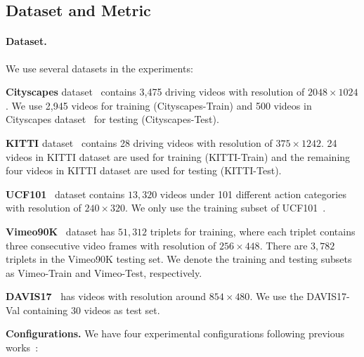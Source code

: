 \documentclass[10pt,twocolumn,letterpaper]{article}
\begin{document}
\subsection{Dataset and Metric}
\label{sec:dataset}
\paragraph{Dataset.} We use several datasets in the experiments:

\vspace{0.4em}
\noindent \textbf{Cityscapes} dataset~\cite{cityscapes} contains 3,475 driving videos with resolution of $2048 \times 1024$. We use 2,945 videos for training (Cityscapes-Train) and 500 videos in Cityscapes dataset~\cite{cityscapes} for testing (Cityscapes-Test).

\vspace{0.4em}
\noindent \textbf{KITTI} dataset~\cite{kitti} contains 28 driving videos with resolution of $375\times 1242$. 24 videos in KITTI dataset are used for training (KITTI-Train) and the remaining four videos in KITTI dataset are used for testing (KITTI-Test).

\vspace{0.4em}
\noindent \textbf{UCF101}~\cite{ucf101} dataset contains $13,320$ videos under 101 different action categories with resolution of $240\times 320$. We only use the training subset of UCF101~\cite{ucf101}.

\vspace{0.4em}
\noindent \textbf{Vimeo90K}~\cite{vimeo} dataset has $51,312$ triplets for training, where each triplet contains three consecutive video frames with resolution of $256\times448$.
There are $3,782$ triplets in the Vimeo90K testing set. We denote the training and testing subsets as Vimeo-Train and Vimeo-Test, respectively.

\vspace{0.4em}
\noindent
\textbf{DAVIS17~\cite{davis}} has videos with resolution around $854\times 480$. We use the DAVIS17-Val containing 30 videos as test set.

\noindent
\textbf{Configurations.} We have four experimental configurations following previous works~\cite{dyan,dvf,wu2022optimizing}:
\end{document}
